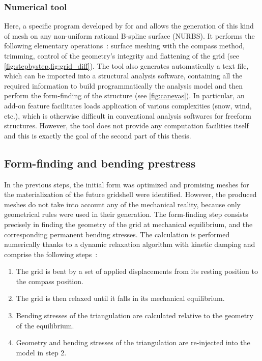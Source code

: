 \subsubsection{Numerical tool}
Here, a specific program developed by \citet{DuPeloux2011} for \rhino{} and \grasshopper{} allows the generation of this kind of mesh on any non-uniform rational B-spline surface (NURBS). It performs the following elementary operations~: surface meshing with the compass method, trimming, control of the geometry’s integrity and flattening of the grid (see \cref{fig:stepbystep,fig:grid_diff}). The tool also generates automatically a text file, which can be imported into a structural analysis software, containing all the required information to build programmatically the analysis model and then perform the form-finding of the structure (see \cref{fig:canevas}). In particular, an add-on feature facilitates loads application of various complexities (snow, wind, etc.), which is otherwise difficult in conventional analysis softwares for freeform structures. However, the tool does not provide any computation facilities itself and this is exactly the goal of the second part of this thesis.

\subsection{Form-finding and bending prestress}\label{sec=form-finding}
In the previous steps, the initial form was optimized and promising meshes for the materialization of the future gridshell were identified. However, the produced meshes do not take into account any of the mechanical reality, because only geometrical rules were used in their generation. The form-finding step consists precisely in finding the geometry of the grid at mechanical equilibrium, and the corresponding permanent bending stresses. The calculation is performed numerically thanks to a dynamic relaxation algorithm with kinetic damping and comprise the following steps~:
\begin{enumerate}
\item The grid is bent by a set of applied displacements from its resting position to the compass position.
\item The grid is then relaxed until it falls in its mechanical equilibrium.
\item Bending stresses of the triangulation are calculated relative to the geometry of the equilibrium.
\item Geometry and bending stresses of the triangulation are re-injected into the model in step 2.
\end{enumerate}

